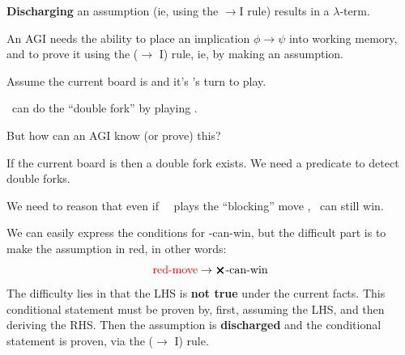 \textbf{Discharging} an assumption (ie, using the $\rightarrow$I rule) results in a $\lambda$-term.

An AGI needs the ability to place an implication $\phi \rightarrow \psi$ into working memory, and to prove it using the ($\rightarrow$ I) rule, ie, by making an assumption.

\begin{tcolorbox}[breakable, parbox=false, fonttitle=\bfseries, title=Tic Tac Toe example]


Assume the current board is
 and it's \bX's turn to play.

\bX \ can do the ``double fork'' by playing
.

But how can an AGI know (or prove) this?

If the current board is 
  then a double fork exists.  We need a predicate to detect double forks.

We need to reason that even if \ \bO \ plays the ``blocking'' move
  , \bX \ can still win.

We can easily express the conditions for \bX-can-win, but the difficult part is to make the assumption in {\color{red}red}, in other words:
\begin{equation}
\mbox{{\color{red}red-move}} \rightarrow \mbox{$\pmb{\bm{\times}}$-can-win}
\end{equation}
The difficulty lies in that the LHS is \textbf{not true} under the current facts.  This conditional statement must be proven by, first, assuming the LHS, and then deriving the RHS.  Then the assumption is \textbf{discharged} and the conditional statement is proven, via the ($\rightarrow$ I) rule.


\end{tcolorbox}
